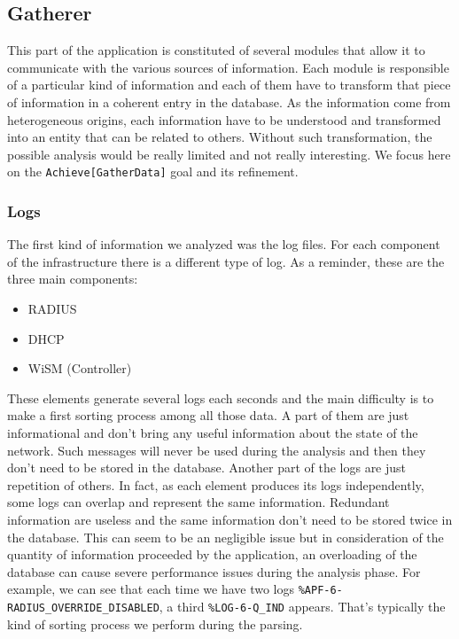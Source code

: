 \subsection{Gatherer}
This part of the application is constituted of several modules that allow it to communicate with the various sources of information. Each module is responsible of a particular kind of information and each of them have to transform that piece of information in a coherent entry in the database. As the information come from heterogeneous origins, each information have to be understood and transformed into an entity that can be related to others. Without such transformation, the possible analysis would be really limited and not really interesting. We focus here on the \texttt{Achieve[GatherData]} goal and its refinement.

\subsubsection{Logs}
The first kind of information we analyzed was the log files. For each component of the infrastructure there is a different type of log. As a reminder, these are the three main components:
\begin{itemize}
\item RADIUS
\item DHCP
\item WiSM (Controller)
\end{itemize}
These elements generate several logs each seconds and the main difficulty is to make a first sorting process among all those data. A part of them are just informational and don't bring any useful information about the state of the network. Such messages will never be used during the analysis and then they don't need to be stored in the database. Another part of the logs are just repetition of others. In fact, as each element produces its logs independently, some logs can overlap and represent the same information. Redundant information are useless and the same information don't need to be stored twice in the database. This can seem to be an negligible issue but in consideration of the quantity of information proceeded by the application, an overloading of the database can cause severe performance issues during the analysis phase. For example, we can see that each time we have two logs \texttt{\%APF-6-RADIUS\_OVERRIDE\_DISABLED}, a third \texttt{\%LOG-6-Q\_IND} appears. That's typically the kind of sorting process we perform during the parsing.\\

